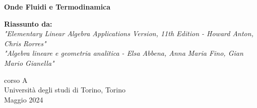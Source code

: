 \begin{titlepage}
	\begin{center}
		\vspace*{1cm}
		\begin{center}
		\end{center}
		\vspace{1.5cm}
		\textbf{\LARGE Onde Fluidi e Termodinamica}
		
		\vspace{0.5cm}
		\textbf{Riassunto da:} \\
		
		\textit{"Elementary Linear Algebra Applications Version, 11th Edition - Howard Anton, Chris Rorres"} \\
		
		\textit{"Algebra lineare e geometria analitica - Elsa Abbena, Anna Maria Fino, Gian Mario Gianella"}
		
		
		\vfill
		
		
		
		\vspace{0.8cm}
		
		
		
		corso A\\
		Università degli studi di Torino, Torino\\
		Maggio 2024\\
		
		
	\end{center}
\end{titlepage}
